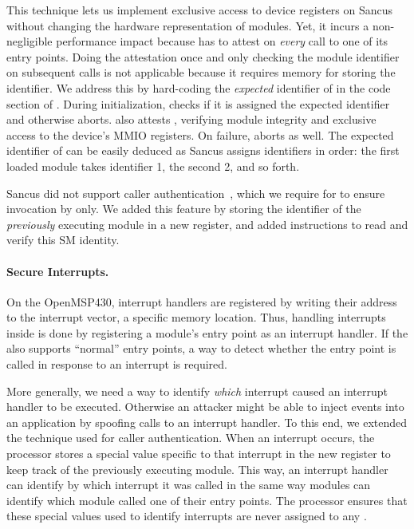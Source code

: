 This technique lets us implement exclusive access to device registers on Sancus
without changing the hardware representation of modules.  Yet, it incurs a
non-negligible performance impact because  has to attest
 on \emph{every} call to one of its entry points. Doing the
attestation once and only checking the module identifier on subsequent calls is
not applicable because it requires memory for storing the identifier. We address
this by hard-coding the \emph{expected} identifier of  in the
code section of .  During initialization,  checks
if it is assigned the expected identifier and otherwise aborts. 
also attests , verifying module integrity and exclusive access to
the device's \ac{MMIO} registers.  On failure,  aborts as well.
The expected identifier of  can be easily deduced as Sancus
assigns identifiers in order: the first loaded module takes identifier 1, the
second 2, and so forth.

\label{concept:caller-authentication} Sancus did not support caller
authentication~\cite{sancus}, which we require for  to ensure
invocation by  only.  We added this feature by storing the
identifier of the \emph{previously} executing module in a new register, and
added instructions to read and verify this \ac{SM} identity.

\paragraph*{Secure Interrupts.}
%
On the OpenMSP430, interrupt handlers are registered by writing their address to
the interrupt vector, a specific memory location.  Thus, handling interrupts
inside \protmods{} is done by registering a module's entry point as an interrupt
handler.  If the \protmod{} also supports \enquote{normal} entry points, a way
to detect whether the entry point is called in response to an interrupt is
required.

More generally, we need a way to identify \emph{which} interrupt caused an
interrupt handler to be executed. Otherwise an attacker might be able to inject
events into an application by spoofing calls to an interrupt handler.  To this
end, we extended the technique used for caller authentication. When an interrupt
occurs, the processor stores a special value specific to that interrupt in the
new register to keep track of the previously executing module.  This way, an
interrupt handler can identify by which interrupt it was called in the same way
modules can identify which module called one of their entry points.  The
processor ensures that these special values used to identify interrupts are
never assigned to any \protmod.

